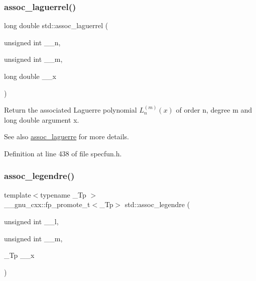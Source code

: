 \subsubsection{\texorpdfstring{assoc\+\_\+laguerrel()}{assoc\_laguerrel()}}
{\footnotesize\ttfamily long double std\+::assoc\+\_\+laguerrel (\begin{DoxyParamCaption}\item[{unsigned int}]{\+\_\+\+\_\+n,  }\item[{unsigned int}]{\+\_\+\+\_\+m,  }\item[{long double}]{\+\_\+\+\_\+x }\end{DoxyParamCaption})\hspace{0.3cm}{\ttfamily [inline]}}

Return the associated Laguerre polynomial $ L_n^{(m)}(x) $ of order {\ttfamily n}, degree {\ttfamily m} and {\ttfamily long double} argument {\ttfamily x}.

\begin{DoxySeeAlso}{See also}
\hyperlink{group__mathsf__std_ga0b33e0ac3066f2353861ce2f34b43f57}{assoc\+\_\+laguerre} for more details. 
\end{DoxySeeAlso}


Definition at line 438 of file specfun.\+h.

\mbox{\label{group__mathsf__std_ga7aa4182446f687094b12688078517d53}} 
\subsubsection{\texorpdfstring{assoc\+\_\+legendre()}{assoc\_legendre()}}
{\footnotesize\ttfamily template$<$typename \+\_\+\+Tp $>$ \\
\+\_\+\+\_\+gnu\+\_\+cxx\+::fp\+\_\+promote\+\_\+t$<$\+\_\+\+Tp$>$ std\+::assoc\+\_\+legendre (\begin{DoxyParamCaption}\item[{unsigned int}]{\+\_\+\+\_\+l,  }\item[{unsigned int}]{\+\_\+\+\_\+m,  }\item[{\+\_\+\+Tp}]{\+\_\+\+\_\+x }\end{DoxyParamCaption})\hspace{0.3cm}{\ttfamily [inline]}}

